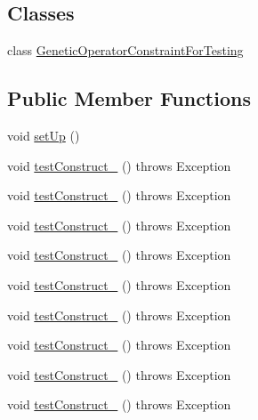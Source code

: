 \subsection*{Classes}
\begin{DoxyCompactItemize}
\item 
class \hyperlink{classorg_1_1jgap_1_1impl_1_1_crossover_operator_test_1_1_genetic_operator_constraint_for_testing}{Genetic\-Operator\-Constraint\-For\-Testing}
\end{DoxyCompactItemize}
\subsection*{Public Member Functions}
\begin{DoxyCompactItemize}
\item 
void \hyperlink{classorg_1_1jgap_1_1impl_1_1_crossover_operator_test_a9783402210f5dca876e6012a5ae5517e}{set\-Up} ()
\item 
void \hyperlink{classorg_1_1jgap_1_1impl_1_1_crossover_operator_test_a8e89fa6faf156308ee6c6e1776dd06ad}{test\-Construct\-\_} ()  throws Exception 
\item 
void \hyperlink{classorg_1_1jgap_1_1impl_1_1_crossover_operator_test_a75fedbdd27191321bda395a07474d6e8}{test\-Construct\-\_} ()  throws Exception 
\item 
void \hyperlink{classorg_1_1jgap_1_1impl_1_1_crossover_operator_test_a6f823453a29ef9107060d90f3b82a6c8}{test\-Construct\-\_} ()  throws Exception 
\item 
void \hyperlink{classorg_1_1jgap_1_1impl_1_1_crossover_operator_test_a27ad387292e289724dfea705c28cd5b1}{test\-Construct\-\_} ()  throws Exception 
\item 
void \hyperlink{classorg_1_1jgap_1_1impl_1_1_crossover_operator_test_ac554ffe6c1b5eb38ed6a5e9f0528b556}{test\-Construct\-\_} ()  throws Exception 
\item 
void \hyperlink{classorg_1_1jgap_1_1impl_1_1_crossover_operator_test_acd61e3a089ee1c208e43d4222fdd6794}{test\-Construct\-\_} ()  throws Exception 
\item 
void \hyperlink{classorg_1_1jgap_1_1impl_1_1_crossover_operator_test_a0513af93be7e58a3ee600e3890906948}{test\-Construct\-\_} ()  throws Exception 
\item 
void \hyperlink{classorg_1_1jgap_1_1impl_1_1_crossover_operator_test_a3cf866a28ee8385b0f5514432f2cfb34}{test\-Construct\-\_} ()  throws Exception 
\item 
void \hyperlink{classorg_1_1jgap_1_1impl_1_1_crossover_operator_test_aee4b6ccb946ca1c408c4e24406a23ba8}{test\-Construct\-\_} ()  throws Exception 

\end{DoxyCompactItemize}

